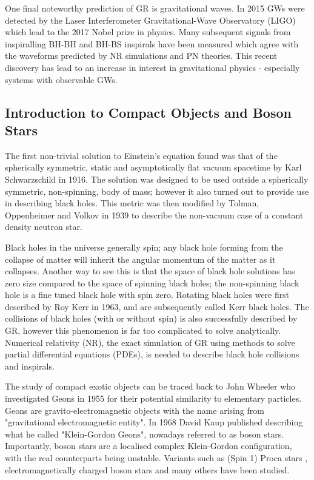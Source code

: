 One final noteworthy prediction of GR is gravitational waves. In 2015 GWs were detected by the Laser Interferometer Gravitational-Wave Observatory (LIGO) which lead to the 2017 Nobel prize in physics. Many subsequent signals from inspiralling BH-BH and BH-BS inspirals have been measured which agree with the waveforms predicted by NR simulations and PN theories. This recent discovery has lead to an increase in interest in gravitational physics - especially systems with observable GWs.

\subsection{Introduction to Compact Objects and Boson Stars}
The first non-trivial solution to Einstein's equation found was that of the spherically symmetric, static and asymptotically flat vacuum spacetime by Karl Schwarzschild in 1916. The solution was designed to be used outside a spherically symmetric, non-spinning, body of mass; however it also turned out to provide use in describing black holes. This metric was then modified by Tolman, Oppenheimer and Volkov in 1939 to describe the non-vacuum case of a constant density neutron star. 

Black holes in the universe generally spin; any black hole forming from the collapse of matter will inherit the angular momentum of the matter as it collapses. Another way to see this is that the space of black hole solutions has zero size compared to the space of spinning black holes; the non-spinning black hole is a fine tuned black hole with spin zero. Rotating black holes were first described by Roy Kerr in 1963, and are subsequently called Kerr black holes. The collisions of black holes (with or without spin) is also successfully described by GR, however this phenomenon is far too complicated to solve analytically. Numerical relativity (NR), the exact simulation of GR using methods to solve partial differential equations (PDEs), is needed to describe black hole collisions and inspirals. 

The study of compact exotic objects can be traced back to John Wheeler who investigated Geons in 1955 for their potential similarity to elementary particles. Geons are gravito-electromagnetic objects with the name arising from "gravitational electromagnetic entity". In 1968 David Kaup published \cite{Kaup:1968zz} describing what he called "Klein-Gordon Geons", nowadays referred to as boson stars. Importantly, boson stars are a localised complex Klein-Gordon configuration, with the real counterparts being unstable. Variants such as (Spin 1) Proca stars \cite{brito2016proca}, electromagnetically charged boson stars and many others have been studied. 

